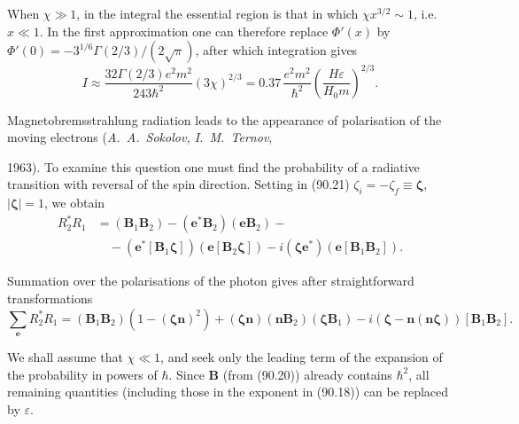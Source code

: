 When $\chi \gg 1$, in the integral the essential region is that in which $\chi x^{3/2} \sim 1$, i.e.\ $x \ll 1$. In the first approximation one can therefore replace $\Phi'(x)$ by $\Phi'(0) = -3^{1/6}\Gamma(2/3)/(2\sqrt{\pi})$, after which integration gives
\begin{equation}
I \approx \frac{32\Gamma(2/3)e^2m^2}{243\hbar^2}(3\chi)^{2/3} = 0.37\,\frac{e^2m^2}{\hbar^2}\left(\frac{H\varepsilon}{H_0 m}\right)^{\!2/3}.
\label{eq:90.27}
\end{equation}


Magnetobremsstrahlung radiation leads to the appearance of polarisation of the moving electrons (\emph{A.~A.~Sokolov, I.~M.~Ternov},

1963). To examine this question one must find the probability of a radiative transition with reversal of the spin direction. Setting in (90.21) $\zeta_i = -\zeta_f \equiv \boldsymbol{\zeta}$, $|\boldsymbol{\zeta}| = 1$, we obtain
\begin{align*}
R_2^*R_1 &= (\mathbf{B}_1\mathbf{B}_2) - (\mathbf{e}^*\mathbf{B}_2)(\mathbf{e}\mathbf{B}_2) - {} \\
&\quad {} - (\mathbf{e}^*[\mathbf{B}_1\boldsymbol{\zeta}])(\mathbf{e}[\mathbf{B}_2\boldsymbol{\zeta}]) - i(\boldsymbol{\zeta}\mathbf{e}^*)(\mathbf{e}[\mathbf{B}_1\mathbf{B}_2]).
\end{align*}

Summation over the polarisations of the photon gives after straightforward transformations
\begin{equation}
\sum_\mathbf{e} R_2^*R_1 = (\mathbf{B}_1\mathbf{B}_2)(1-(\boldsymbol{\zeta}\mathbf{n})^2) + (\boldsymbol{\zeta}\mathbf{n})(\mathbf{n}\mathbf{B}_2)(\boldsymbol{\zeta}\mathbf{B}_1) - i(\boldsymbol{\zeta} - \mathbf{n}(\mathbf{n}\boldsymbol{\zeta}))[\mathbf{B}_1\mathbf{B}_2].
\label{eq:90.28}
\end{equation}

We shall assume that $\chi \ll 1$, and seek only the leading term of the expansion of the probability in powers of $\hbar$. Since $\mathbf{B}$ (from (90.20)) already contains $\hbar^2$, all remaining quantities (including those in the exponent in (90.18)) can be replaced by $\varepsilon$.

